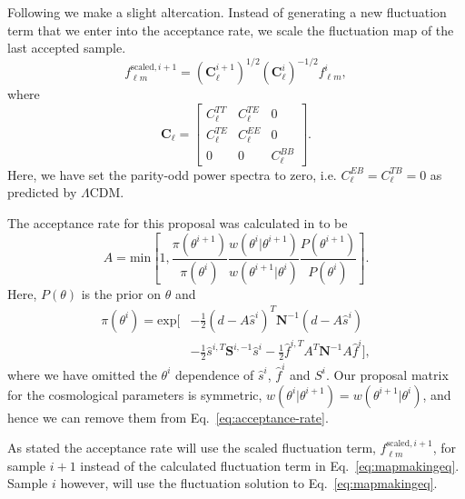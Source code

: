 \documentclass[twocolumn]{../common/aa}
\def\LCDM{$\Lambda$CDM}
\begin{document}
Following \cite{racine:2016} we make a slight altercation. Instead of generating a new fluctuation term that we enter into the acceptance rate, we scale the fluctuation map of the last accepted sample.
\begin{equation}
    f_{\ell m}^{\textrm{scaled}, i+1} = \left(\textbf{C}^{i+1}_{\ell}\right)^{1/2}\left(\textbf{C}^{i}_{\ell}\right)^{-1/2} f_{\ell m}^{i},
\end{equation}
where
\begin{equation}
\textbf{C}_{\ell} = \begin{bmatrix}
C^{TT}_\ell & C^{TE}_\ell & 0\\
C^{TE}_\ell & C^{EE}_\ell & 0\\
0 & 0 & C^{BB}_\ell
\end{bmatrix}.
\end{equation}
Here, we have set the parity-odd power spectra to zero, i.e. $C^{EB}_\ell =C^{TB}_\ell = 0$ as predicted by \LCDM.

The acceptance rate for this proposal was calculated in \cite{racine:2016} to be
\begin{equation}
    \label{eq:acceptance-rate}
    A = \mathrm{min}\left[1, \frac{\pi(\theta^{i+1})}{\pi(\theta^i)} \frac{w(\theta^{i} |\theta^{i+1})}{w(\theta^{i+1} |\theta^i) }\frac{P(\theta^{i+1})}{P(\theta^i)} \right].
\end{equation}
Here, $P(\theta)$ is the prior on $\theta$ and
\begin{align}
    \nonumber
    \pi(\theta^{i}) = \mathrm{exp}\bigg[&-\frac12 \left(d-A\hat{s}^i\right)^T \textbf{N}^{-1}\left(d-A\hat{s}^i\right)\\
    &-\frac12 \hat{s}^{i,T} \textbf{S}^{i, -1}\hat{s}^i -\frac12 \hat{f}^{i, T}A^T\textbf{N}^{-1} A\hat{f}^i\bigg],
\end{align}
where we have omitted the $\theta^i$ dependence of $\hat{s}^i$, $\hat{f}^i$ and $S^i$. Our proposal matrix for the cosmological parameters is symmetric, $w(\theta^{i} |\theta^{i+1}) = w(\theta^{i+1} |\theta^{i})$, and hence we can remove them from Eq.~\eqref{eq:acceptance-rate}.

As stated the acceptance rate will use the scaled fluctuation term, $f_{\ell m}^{\textrm{scaled}, i+1}$, for sample $i+1$ instead of the calculated fluctuation term in Eq.~\eqref{eq:mapmakingeq}. Sample $i$ however, will use the fluctuation solution to Eq.~\eqref{eq:mapmakingeq}.
\end{document}
